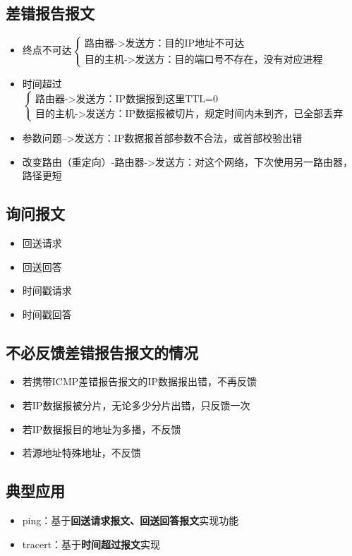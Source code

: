 \subsection{差错报告报文}
\begin{itemize}
    \item 终点不可达\(\begin{cases}
        \text{路由器->发送方：目的IP地址不可达} \\ 
        \text{目的主机->发送方：目的端口号不存在，没有对应进程}
    \end{cases}\)
    \item 时间超过\(\begin{cases}
        \text{路由器->发送方：IP数据报到这里TTL=0} \\ 
        \text{目的主机->发送方：IP数据报被切片，规定时间内未到齐，已全部丢弃}
    \end{cases}\)
    \item 参数问题-->发送方：IP数据报首部参数不合法，或首部校验出错
    \item 改变路由（重定向）-路由器->发送方：对这个网络，下次使用另一路由器，路径更短
\end{itemize}


\subsection{询问报文}
\begin{itemize}
    \item 回送请求
    \item 回送回答
    \item 时间戳请求
    \item 时间戳回答
\end{itemize}


\subsection{不必反馈差错报告报文的情况}
\begin{itemize}
    \item 若携带ICMP差错报告报文的IP数据报出错，不再反馈
    \item 若IP数据报被分片，无论多少分片出错，只反馈一次
    \item 若IP数据报目的地址为多播，不反馈
    \item 若源地址特殊地址，不反馈
\end{itemize}


\subsection{典型应用}
\begin{itemize}
    \item ping：基于\textbf{回送请求报文、回送回答报文}实现功能
    \item tracert：基于\textbf{时间超过报文}实现
\end{itemize}


